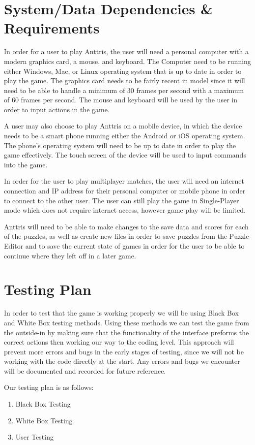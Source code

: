 \documentclass[12pt]{article}
\begin{document}
\section{System/Data Dependencies \& Requirements}
In order for a user to play Anttris, the user will need a personal computer with a modern graphics card, a mouse, and keyboard. The Computer need to be running either Windows, Mac, or Linux operating system that is up to date in order to play the game.
The graphics card needs to be fairly recent in model since it will need to be able to handle a minimum of 30 frames per second with a maximum of 60 frames per second.
The mouse and keyboard will be used by the user in order to input actions in the game.

A user may also choose to play Anttris on a mobile device, in which the device needs to be a smart phone running either the Android or iOS operating system. The phone's operating system will need to be up to date in order to play the game effectively. The touch screen of the device will be used to input commands into the game.

In order for the user to play multiplayer matches, the user will need an internet connection and IP address for their personal computer or mobile phone in order to connect to the other user. The user can still play the game in Single-Player mode which does not require internet access, however game play will be limited.

Anttris will need to be able to make changes to the save data and scores for each of the puzzles, as well as create new files in order to save puzzles from the Puzzle Editor and to save the current state of games in order for the user to be able to continue where they left off in a later game.
\section{Testing Plan}

In order to test that the game is working properly we will be using Black Box and White Box testing methods. Using these methods we can test the game from the outside-in by making sure that the functionality of the interface preforms the correct actions then working our way to the coding level. This approach will prevent more errors and bugs in the early stages of testing, since we will not be working with the code directly at the start. Any errors and bugs we encounter will be documented and recorded for future reference.

Our testing plan is as follows:
\begin{enumerate}
\item Black Box Testing
\item White Box Testing
\item User Testing
\end{enumerate}
\end{document}
